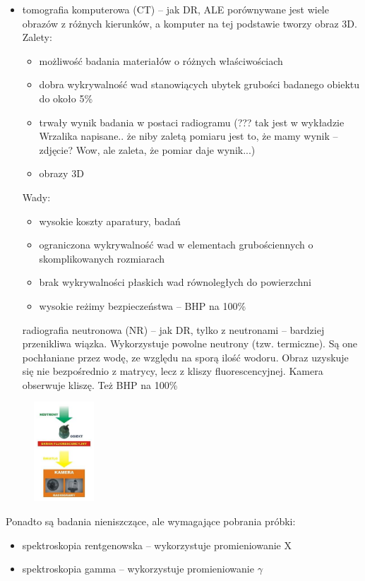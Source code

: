 \documentclass{article}
\begin{document}
\begin{enumerate}
\begin{itemize}
\item tomografia komputerowa (CT) – jak DR, ALE porównywane jest wiele obrazów z różnych kierunków, a komputer na tej podstawie tworzy obraz 3D. Zalety:
\begin{itemize}
\item możliwość badania materiałów o różnych właściwościach
\item dobra wykrywalność wad stanowiących ubytek grubości badanego obiektu do około 5\%
\item trwały wynik badania w postaci radiogramu (??? tak jest w wykładzie Wrzalika napisane.. że niby zaletą pomiaru jest to, że mamy wynik – zdjęcie? Wow, ale zaleta, że pomiar daje wynik...)
\item obrazy 3D
\end{itemize}
Wady:
\begin{itemize}
\item wysokie koszty aparatury, badań
\item ograniczona wykrywalność wad w elementach grubościennych o skomplikowanych rozmiarach
\item brak wykrywalności płaskich wad równoległych do powierzchni
\item wysokie reżimy bezpieczeństwa – BHP na 100\%
\end{itemize}
radiografia neutronowa (NR) – jak DR, tylko z neutronami – bardziej przenikliwa wiązka. Wykorzystuje powolne neutrony (tzw. termiczne). Są one pochłaniane przez wodę, ze względu na sporą ilość wodoru. Obraz uzyskuje się nie bezpośrednio z matrycy, lecz z kliszy fluorescencyjnej. Kamera obserwuje kliszę. Też BHP na 100\%

\end{itemize}


\begin{figure}[h!]
\centering
\includegraphics[width=0.2\textwidth]{radio}
\end{figure}


Ponadto są badania nieniszczące, ale wymagające pobrania próbki:
\begin{itemize}
\item spektroskopia rentgenowska – wykorzystuje promieniowanie X
\item spektroskopia gamma – wykorzystuje promieniowanie  $\gamma$
\end{itemize}


\end{enumerate}
\end{document}
